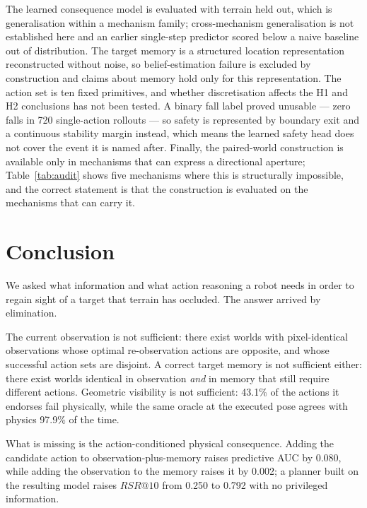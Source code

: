 \documentclass[utf8]{FrontiersinHarvard}
\begin{document}
The learned consequence model is evaluated with terrain held out, which is
generalisation within a mechanism family; cross-mechanism generalisation is not
established here and an earlier single-step predictor scored below a naive baseline out
of distribution. The target memory is a structured location representation reconstructed
without noise, so belief-estimation failure is excluded by construction and claims about
memory hold only for this representation. The action set is ten fixed primitives, and
whether discretisation affects the H1 and H2 conclusions has not been tested. A binary
fall label proved unusable --- zero falls in 720 single-action rollouts --- so safety is
represented by boundary exit and a continuous stability margin instead, which means the
learned safety head does not cover the event it is named after. Finally, the paired-world
construction is available only in mechanisms that can express a directional aperture;
Table~\ref{tab:audit} shows five mechanisms where this is structurally impossible, and
the correct statement is that the construction is evaluated on the mechanisms that can
carry it.

\section{Conclusion}

We asked what information and what action reasoning a robot needs in order to regain
sight of a target that terrain has occluded. The answer arrived by elimination.

The current observation is not sufficient: there exist worlds with pixel-identical
observations whose optimal re-observation actions are opposite, and whose successful
action sets are disjoint. A correct target memory is not sufficient either: there exist
worlds identical in observation \emph{and} in memory that still require different
actions. Geometric visibility is not sufficient: 43.1\% of the actions it endorses fail
physically, while the same oracle at the executed pose agrees with physics 97.9\% of the
time.

What is missing is the action-conditioned physical consequence. Adding the candidate
action to observation-plus-memory raises predictive AUC by 0.080, while adding the
observation to the memory raises it by 0.002; a planner built on the resulting model
raises $RSR@10$ from 0.250 to 0.792 with no privileged information.
\end{document}
